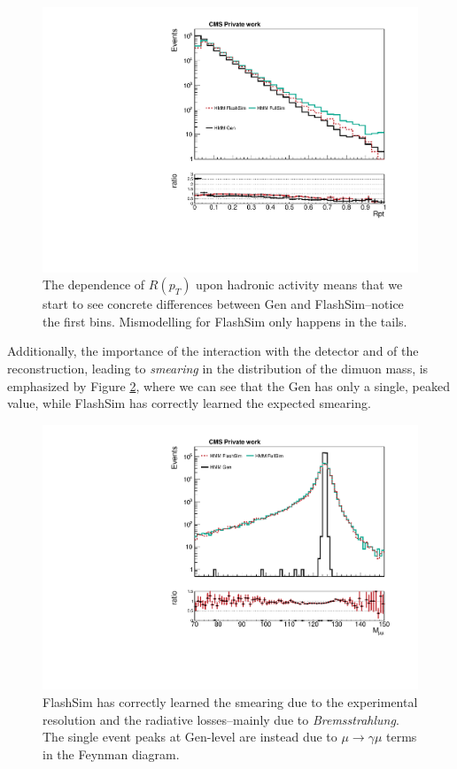 \begin{figure}
    \centering
    \includegraphics[width=\linewidth]{gfx/ch6/gen_vs_flash_Rpt___PreSel_log.pdf}
    \caption[Gen vs FlashSim for $R(p_T)$]{The dependence of $R(p_T)$ upon hadronic activity means that we start to see concrete differences between Gen and FlashSim--notice the first bins. Mismodelling for FlashSim only happens in the tails.}
    \label{fig:rptgen}
   \end{figure}
   
Additionally, the importance of the interaction with the detector and of the reconstruction, leading to \emph{smearing} in the distribution of the dimuon mass, is emphasized by Figure \ref{fig:higggen}, where we can see that the Gen has only a single, peaked value, while FlashSim has correctly learned the expected smearing.

\begin{figure}
    \centering
    \includegraphics[width=\linewidth]{gfx/ch6/gen_vs_flash_Higgs_m___PreSel_log.pdf}
    \caption[Gen vs FlashSim for $M_{\mu\mu}$]{FlashSim has correctly learned the smearing due to the experimental resolution and the radiative losses--mainly due to \emph{Bremsstrahlung}. The single event peaks at Gen-level are instead due to $\mu \rightarrow \gamma \mu$ terms in the Feynman diagram.}
    \label{fig:higggen}
   \end{figure}
   
